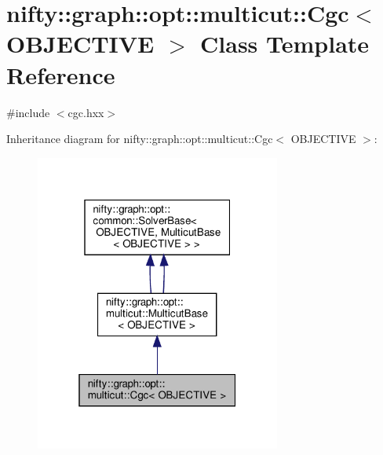 \hypertarget{classnifty_1_1graph_1_1opt_1_1multicut_1_1Cgc}{}\section{nifty\+:\+:graph\+:\+:opt\+:\+:multicut\+:\+:Cgc$<$ O\+B\+J\+E\+C\+T\+I\+VE $>$ Class Template Reference}
\label{classnifty_1_1graph_1_1opt_1_1multicut_1_1Cgc}


{\ttfamily \#include $<$cgc.\+hxx$>$}



Inheritance diagram for nifty\+:\+:graph\+:\+:opt\+:\+:multicut\+:\+:Cgc$<$ O\+B\+J\+E\+C\+T\+I\+VE $>$\+:
\nopagebreak
\begin{figure}[H]
\begin{center}
\leavevmode
\includegraphics[width=229pt]{classnifty_1_1graph_1_1opt_1_1multicut_1_1Cgc__inherit__graph}
\end{center}
\end{figure}


